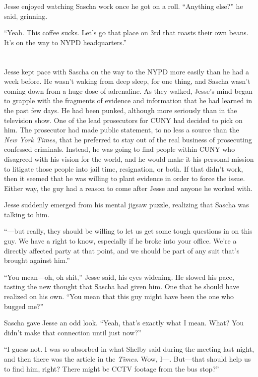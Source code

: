 \documentclass[12pt]{book}
\begin{document}
Jesse enjoyed watching Sascha work once he got on a roll.  ``Anything else?'' he said, grinning.

``Yeah.  This coffee sucks.  Let's go that place on 3rd that roasts their own beans.  It's on the way to NYPD headquarters.''

\chapter{}

Jesse kept pace with Sascha on the way to the NYPD more easily than he had a week before.  He wasn't waking from deep sleep, for one thing, and Sascha wasn't coming down from a huge dose of adrenaline.  As they walked, Jesse's mind began to grapple with the fragments of evidence and information that he had learned in the past few days.  He had been punked, although more seriously than in the television show.  One of the lead prosecutors for CUNY had decided to pick on him.  The prosecutor had made public statement, to no less a source than the \emph{New York Times}, that he preferred to stay out of the real business of prosecuting confessed criminals.  Instead, he was going to find people within CUNY who disagreed with his vision for the world, and he would make it his personal mission to litigate those people into jail time, resignation, or both.  If that didn't work, then it seemed that he was willing to plant evidence in order to force the issue.  Either way, the guy had a reason to come after Jesse  and anyone he worked with.

Jesse suddenly emerged from his mental jigsaw puzzle, realizing that Sascha was talking to him.

``---but really, they should be willing to let us get some tough questions in on this guy.  We have a right to know, especially if he broke into your office.  We're a directly affected party at that point, and we should be part of any suit that's brought against him.''

``You mean---oh, oh shit,'' Jesse said, his eyes widening.  He slowed his pace, tasting the new thought that Sascha had given him.  One that he should have realized on his own.  ``You mean that this guy might have been the one who bugged me?''

Sascha gave Jesse an odd look.  ``Yeah, that's exactly what I mean.  What?  You didn't make that connection until just now?''

``I guess not.  I was so absorbed in what Shelby said during the meeting last night, and then there was the article in the \emph{Times}.  Wow, I---.  But---that should help us to find him, right?  There might be CCTV footage from the bus stop?''
\end{document}
